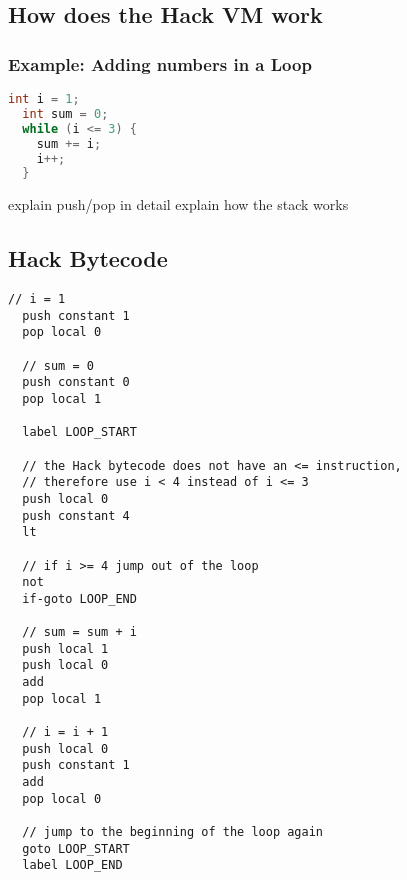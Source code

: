 
\subsection{How does the Hack VM work}
\subsubsection{Example: Adding numbers in a Loop}
\begin{lstlisting}[language=C, caption={Calculate 1 + 2 + 3 in C}, captionpos=b]
  int i = 1;
  int sum = 0;
  while (i <= 3) {
    sum += i;
    i++;
  }
\end{lstlisting}

explain push/pop in detail
explain how the stack works

\subsection{Hack Bytecode} \label{hack-bytecode}
\begin{lstlisting}[caption={Calculate 1 + 2 + 3 in the Hack VM}, captionpos=b]
  // i = 1
  push constant 1
  pop local 0

  // sum = 0
  push constant 0
  pop local 1

  label LOOP_START

  // the Hack bytecode does not have an <= instruction,
  // therefore use i < 4 instead of i <= 3
  push local 0
  push constant 4
  lt

  // if i >= 4 jump out of the loop
  not
  if-goto LOOP_END

  // sum = sum + i
  push local 1
  push local 0
  add
  pop local 1

  // i = i + 1
  push local 0
  push constant 1
  add
  pop local 0

  // jump to the beginning of the loop again
  goto LOOP_START
  label LOOP_END
\end{lstlisting}
